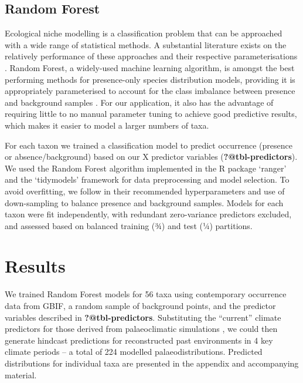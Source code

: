 \documentclass[
  authoryear,
  review]{elsarticle}
\begin{document}
\subsection{Random Forest}\label{random-forest}

Ecological niche modelling is a classification problem that can be
approached with a wide range of statistical methods. A substantial
literature exists on the relatively performance of these approaches and
their respective parameterisations \citep[reviewed
in][]{ValaviEtAl2022}. Random Forest, a widely-used machine learning
algorithm, is amongst the best performing methods for presence-only
species distribution models, providing it is appropriately parameterised
to account for the class imbalance between presence and background
samples \citep{ValaviEtAl2021, ValaviEtAl2022}. For our application, it
also has the advantage of requiring little to no manual parameter tuning
to achieve good predictive results, which makes it easier to model a
larger numbers of taxa.

For each taxon we trained a classification model to predict occurrence
(presence or absence/background) based on our X predictor variables
(\textbf{?@tbl-predictors}). We used the Random Forest algorithm
implemented in the R package `ranger' \citep{WrightZiegler2017} and the
`tidymodels' \citep{tidymodels} framework for data preprocessing and
model selection. To avoid overfitting, we follow \citet{ValaviEtAl2021}
in their recommended hyperparameters and use of down-sampling to balance
presence and background samples. Models for each taxon were fit
independently, with redundant zero-variance predictors excluded, and
assessed based on balanced training (¾) and test (¼) partitions.

\section{Results}\label{results}

We trained Random Forest models for 56 taxa using contemporary
occurrence data from GBIF, a random sample of background points, and the
predictor variables described in \textbf{?@tbl-predictors}. Substituting
the ``current'' climate predictors for those derived from palaeoclimatic
simulations \citep{BrownEtAl2018}, we could then generate hindcast
predictions for reconstructed past environments in 4 key climate periods
-- a total of 224 modelled palaeodistributions. Predicted distributions
for individual taxa are presented in the appendix and accompanying
material.
\end{document}
